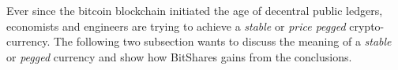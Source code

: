 Ever since the bitcoin blockchain initiated the age of decentral public
ledgers, economists and engineers are trying to achieve a \emph{stable} or
\emph{price pegged} crypto-currency. The following two subsection wants to
discuss the meaning of a \emph{stable} or \emph{pegged} currency and show how
BitShares gains from the conclusions.
